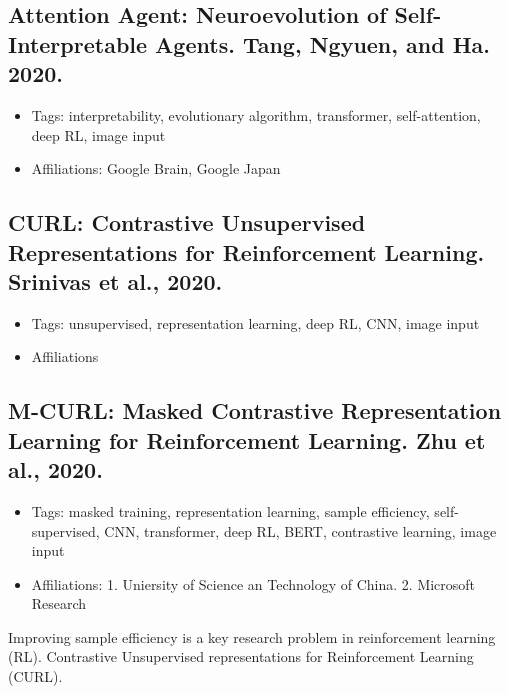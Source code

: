 \subsection{Attention Agent: Neuroevolution of Self-Interpretable Agents. Tang, Ngyuen, and Ha. 2020.} 
\begin{itemize}
	\item Tags: interpretability, evolutionary algorithm, transformer, self-attention, deep RL, image input
	\item Affiliations: Google Brain, Google Japan
\end{itemize}



\subsection{CURL: Contrastive Unsupervised Representations for Reinforcement Learning. Srinivas et al., 2020.}
\begin{itemize}
	\item Tags: unsupervised, representation learning, deep RL, CNN, image input
	\item Affiliations
\end{itemize}

\subsection{M-CURL: Masked Contrastive Representation Learning for Reinforcement Learning. Zhu et al., 2020.}
\begin{itemize}
	\item Tags: masked training, representation learning, sample efficiency, self-supervised, CNN, transformer, deep RL, BERT, contrastive learning, image input
	\item Affiliations: 1. Uniersity of Science an Technology of China. 2. Microsoft Research
\end{itemize}

Improving sample efficiency is a key research problem in reinforcement learning (RL). Contrastive Unsupervised representations for Reinforcement Learning (CURL).


